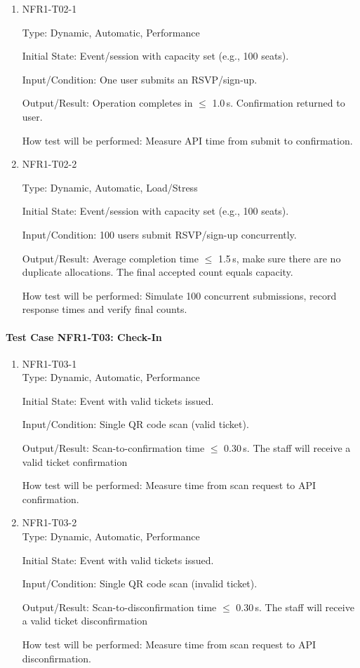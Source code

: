 \documentclass[12pt, titlepage]{article}
\begin{document}
\begin{enumerate}

\item{NFR1-T02-1\\}

Type: Dynamic, Automatic, Performance
					
Initial State: Event/session with capacity set (e.g., 100 seats).
					
Input/Condition: One user submits an RSVP/sign-up.
					
Output/Result:  Operation completes in $\leq$ 1.0\,s. Confirmation returned to user.
					
How test will be performed: Measure API time from submit to confirmation.

\item{NFR1-T02-2\\}

Type: Dynamic, Automatic, Load/Stress

Initial State: Event/session with capacity set (e.g., 100 seats).

Input/Condition: 100 users submit RSVP/sign-up concurrently.

Output/Result: Average completion time $\leq$ 1.5\,s, make sure there are no duplicate allocations. The final accepted count equals capacity.

How test will be performed: Simulate 100 concurrent submissions, record response times and verify final counts.
\end{enumerate}

\paragraph{Test Case NFR1-T03: Check-In}

\begin{enumerate}
\item{NFR1-T03-1\\}
Type: Dynamic, Automatic, Performance

Initial State: Event with valid tickets issued.

Input/Condition: Single QR code scan (valid ticket).

Output/Result: Scan-to-confirmation time $\leq$ 0.30\,s. The staff will receive a valid ticket confirmation

How test will be performed: Measure time from scan request to API confirmation.

\item{NFR1-T03-2\\}
Type: Dynamic, Automatic, Performance

Initial State: Event with valid tickets issued.

Input/Condition: Single QR code scan (invalid ticket).

Output/Result: Scan-to-disconfirmation time $\leq$ 0.30\,s. The staff will receive a valid ticket disconfirmation

How test will be performed: Measure time from scan request to API disconfirmation.
\end{enumerate}
\end{document}
